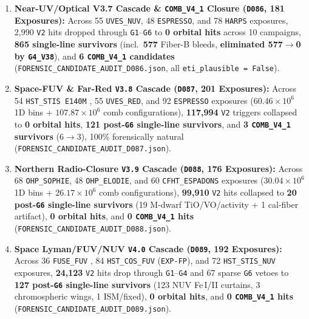 \documentclass[twocolumn,10pt]{article}
\begin{document}
\begin{enumerate}
  \item \textbf{Near-UV/Optical V3.7 Cascade \& \texttt{COMB\_V4\_1} Closure (\texttt{D086}, 181 Exposures):} Across 55 \texttt{UVES\_NUV}, 48 \texttt{ESPRESSO}, and 78 \texttt{HARPS} exposures, 2,990 \texttt{V2} hits dropped through \texttt{G1}--\texttt{G6} to \textbf{0 orbital hits} across 10 campaigns, \textbf{865 single-line survivors} (incl.\ \textbf{577} Fiber-B bleeds, \textbf{eliminated 577$\rightarrow$0 by \texttt{G4\_V38}}), and \textbf{6 \texttt{COMB\_V4\_1} candidates} (\texttt{FORENSIC\_CANDIDATE\_AUDIT\_D086.json}, all \texttt{eti\_plausible = False}).
  \item \textbf{Space-FUV \& Far-Red \texttt{V3.8} Cascade (\texttt{D087}, 201 Exposures):} Across 54 \texttt{HST\_STIS E140M} \cite{Woodgate1998}, 55 \texttt{UVES\_RED}, and 92 \texttt{ESPRESSO} exposures ($60.46\times 10^6$ 1D bins + $107.87\times 10^6$ comb configurations), \textbf{117,994} \texttt{V2} triggers collapsed to \textbf{0 orbital hits}, \textbf{121 post-\texttt{G6} single-line survivors}, and \textbf{3 \texttt{COMB\_V4\_1} survivors} ($6 \rightarrow 3$), 100\% forensically natural (\texttt{FORENSIC\_CANDIDATE\_AUDIT\_D087.json}).
  \item \textbf{Northern Radio-Closure \texttt{V3.9} Cascade (\texttt{D088}, 176 Exposures):} Across 68 \texttt{OHP\_SOPHIE}, 48 \texttt{OHP\_ELODIE}, and 60 \texttt{CFHT\_ESPADONS} exposures ($30.04\times 10^6$ 1D bins + $26.17\times 10^6$ comb configurations), \textbf{99,910} \texttt{V2} hits collapsed to \textbf{20 post-\texttt{G6} single-line survivors} (19 M-dwarf TiO/VO/activity + 1 cal-fiber artifact), \textbf{0 orbital hits}, and \textbf{0 \texttt{COMB\_V4\_1} hits} (\texttt{FORENSIC\_CANDIDATE\_AUDIT\_D088.json}).
  \item \textbf{Space Lyman/FUV/NUV \texttt{V4.0} Cascade (\texttt{D089}, 192 Exposures):} Across 36 \texttt{FUSE\_FUV} \cite{Moos2000}, 84 \texttt{HST\_COS\_FUV} \cite{Green2012} (\texttt{EXP-FP}), and 72 \texttt{HST\_STIS\_NUV} exposures, \textbf{24,123} \texttt{V2} hits drop through \texttt{G1}--\texttt{G4} and 67 sparse \texttt{G6} vetoes to \textbf{127 post-\texttt{G6} single-line survivors} (123 NUV Fe\,I/II curtains, 3 chromospheric wings, 1 ISM/fixed), \textbf{0 orbital hits}, and \textbf{0 \texttt{COMB\_V4\_1} hits} (\texttt{FORENSIC\_CANDIDATE\_AUDIT\_D089.json}).

\end{enumerate}
\end{document}
